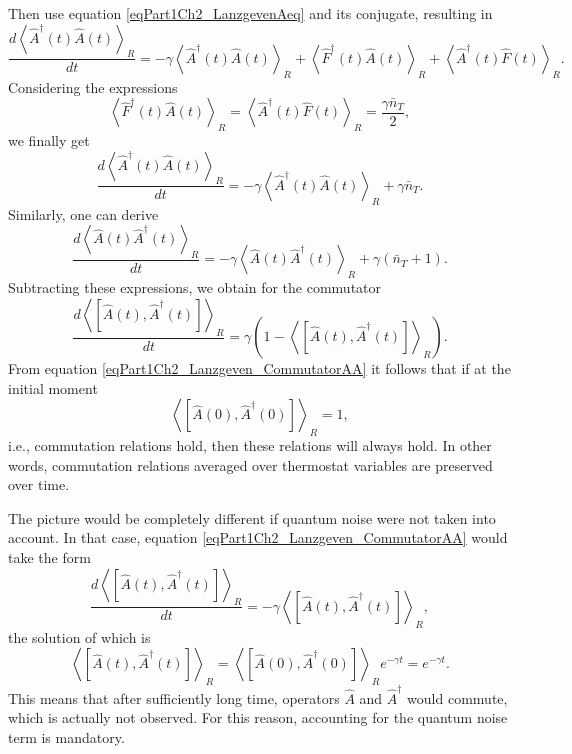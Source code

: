 Then use equation \eqref{eqPart1Ch2_LanzgevenAeq} and its conjugate, resulting in
\begin{equation}
\frac{d \left<\hat{A}^{\dag}\left(t\right)\hat{A}\left(t\right)\right>_R}{d
t}=
- \gamma \left<\hat{A}^{\dag}\left(t\right)\hat{A}\left(t\right)\right>_R
+ \left<\hat{F}^{\dag}\left(t\right)\hat{A}\left(t\right)\right>_R + 
\left<\hat{A}^{\dag}\left(t\right)\hat{F}\left(t\right)\right>_R.
\nonumber
\end{equation}
Considering the expressions 
\begin{equation}
\left<\hat{F}^{\dag}\left(t\right)\hat{A}\left(t\right)\right>_R =
\left<\hat{A}^{\dag}\left(t\right)\hat{F}\left(t\right)\right>_R = 
\frac{\gamma \bar{n}_T}{2},
\nonumber
\end{equation}
we finally get
\begin{equation}
\frac{d \left<\hat{A}^{\dag}\left(t\right)\hat{A}\left(t\right)\right>_R}{d
t}=
- \gamma \left<\hat{A}^{\dag}\left(t\right)\hat{A}\left(t\right)\right>_R
+ \gamma \bar{n}_T.
\nonumber
\end{equation}
Similarly, one can derive
\begin{equation}
\frac{d \left<\hat{A}\left(t\right)\hat{A}^{\dag}\left(t\right)\right>_R}{d
t}=
- \gamma \left<\hat{A}\left(t\right)\hat{A}^{\dag}\left(t\right)\right>_R
+ \gamma \left(\bar{n}_T + 1\right).
\label{eqPart1Ch2_Lanzgeven_Task3}
\end{equation}
Subtracting these expressions, we obtain for the commutator
\begin{equation}
\frac{d \left<\left[\hat{A}\left(t\right),\hat{A}^{\dag}\left(t\right)\right]\right>_R}{d
t}=
\gamma \left( 1 - \left<\left[\hat{A}\left(t\right),\hat{A}^{\dag}\left(t\right)\right]\right>_R
\right).
\label{eqPart1Ch2_Lanzgeven_CommutatorAA}
\end{equation}
From equation \eqref{eqPart1Ch2_Lanzgeven_CommutatorAA} it follows that if at the initial moment
\[
\left<\left[\hat{A}\left(0\right),\hat{A}^{\dag}\left(0\right)\right]\right>_R
= 1,
\]
i.e., commutation relations hold, then these relations will always hold. In other words, commutation relations averaged over thermostat variables are preserved over time.

The picture would be completely different if quantum noise were not taken into account. In that case, equation
\eqref{eqPart1Ch2_Lanzgeven_CommutatorAA} would take the form
\begin{equation}
\frac{d \left<\left[\hat{A}\left(t\right),\hat{A}^{\dag}\left(t\right)\right]\right>_R}{d
t}=
- \gamma \left<\left[\hat{A}\left(t\right),\hat{A}^{\dag}\left(t\right)\right]\right>_R,
\nonumber
\end{equation}
the solution of which is
\begin{equation}
\left<\left[\hat{A}\left(t\right),\hat{A}^{\dag}\left(t\right)\right]\right>_R
= 
\left<\left[\hat{A}\left(0\right),\hat{A}^{\dag}\left(0\right)\right]\right>_R
e^{- \gamma t}= e^{- \gamma t}.
\nonumber
\end{equation}
This means that after sufficiently long time, operators $\hat{A}$ and
$\hat{A}^{\dag}$ would commute, which is actually not observed. For this reason, accounting for the quantum noise term is mandatory.

